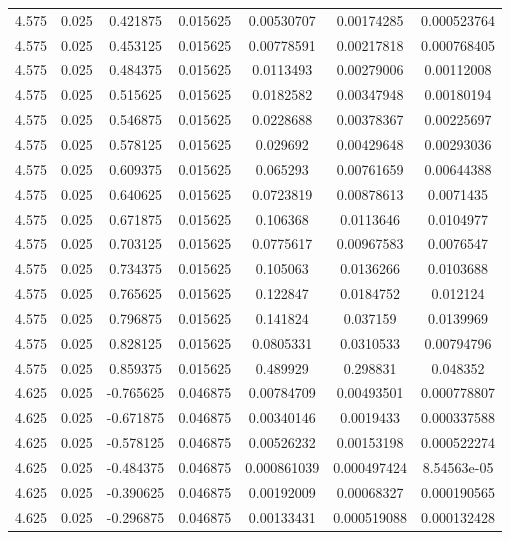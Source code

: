 \begin{table}[bh]
\begin{center}
{\begin{tabular}{ccccccc}
4.575	 & 0.025 & 	0.421875	 & 0.015625	 & 0.00530707	 & 0.00174285	 & 0.000523764 \\ 
4.575	 & 0.025 & 	0.453125	 & 0.015625	 & 0.00778591	 & 0.00217818	 & 0.000768405 \\ 
4.575	 & 0.025 & 	0.484375	 & 0.015625	 & 0.0113493	 & 0.00279006	 & 0.00112008 \\ 
4.575	 & 0.025 & 	0.515625	 & 0.015625	 & 0.0182582	 & 0.00347948	 & 0.00180194 \\ 
4.575	 & 0.025 & 	0.546875	 & 0.015625	 & 0.0228688	 & 0.00378367	 & 0.00225697 \\ 
4.575	 & 0.025 & 	0.578125	 & 0.015625	 & 0.029692	 & 0.00429648	 & 0.00293036 \\ 
4.575	 & 0.025 & 	0.609375	 & 0.015625	 & 0.065293	 & 0.00761659	 & 0.00644388 \\ 
4.575	 & 0.025 & 	0.640625	 & 0.015625	 & 0.0723819	 & 0.00878613	 & 0.0071435 \\ 
4.575	 & 0.025 & 	0.671875	 & 0.015625	 & 0.106368	 & 0.0113646	 & 0.0104977 \\ 
4.575	 & 0.025 & 	0.703125	 & 0.015625	 & 0.0775617	 & 0.00967583	 & 0.0076547 \\ 
4.575	 & 0.025 & 	0.734375	 & 0.015625	 & 0.105063	 & 0.0136266	 & 0.0103688 \\ 
4.575	 & 0.025 & 	0.765625	 & 0.015625	 & 0.122847	 & 0.0184752	 & 0.012124 \\ 
4.575	 & 0.025 & 	0.796875	 & 0.015625	 & 0.141824	 & 0.037159	 & 0.0139969 \\ 
4.575	 & 0.025 & 	0.828125	 & 0.015625	 & 0.0805331	 & 0.0310533	 & 0.00794796 \\ 
4.575	 & 0.025 & 	0.859375	 & 0.015625	 & 0.489929	 & 0.298831	 & 0.048352 \\ 
4.625	 & 0.025 & 	-0.765625	 & 0.046875	 & 0.00784709	 & 0.00493501	 & 0.000778807 \\ 
4.625	 & 0.025 & 	-0.671875	 & 0.046875	 & 0.00340146	 & 0.0019433	 & 0.000337588 \\ 
4.625	 & 0.025 & 	-0.578125	 & 0.046875	 & 0.00526232	 & 0.00153198	 & 0.000522274 \\ 
4.625	 & 0.025 & 	-0.484375	 & 0.046875	 & 0.000861039	 & 0.000497424	 & 8.54563e-05 \\ 
4.625	 & 0.025 & 	-0.390625	 & 0.046875	 & 0.00192009	 & 0.00068327	 & 0.000190565 \\ 
4.625	 & 0.025 & 	-0.296875	 & 0.046875	 & 0.00133431	 & 0.000519088	 & 0.000132428 \\ 

\end{tabular}}
\end{center}
\end{table}
